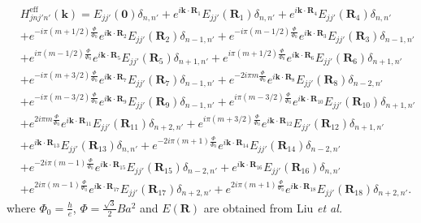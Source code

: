\documentclass{article}
\begin{document}
\begin{equation}
	\begin{aligned}
		 & H_{jnj'n'}^{\text{eff}}(\mathbf{k})
		= E_{jj'}(\mathbf{0}) \delta_{n,n'}
		+ e^{i\mathbf{k} \cdot \mathbf{R}_{1}}E_{jj'}(\mathbf{R}_{1}) \delta_{n,n'}
		+ e^{i\mathbf{k} \cdot \mathbf{R}_{4}}E_{jj'}(\mathbf{R}_{4}) \delta_{n,n'}                                                  \\
		 & + e^{-i\pi(m + 1/2)\frac{\Phi}{\Phi_{0}}}e^{i\mathbf{k} \cdot \mathbf{R}_{2}} E_{jj'}(\mathbf{R}_{2}) \delta_{n-1,n'}
		+ e^{-i\pi(m - 1/2)\frac{\Phi}{\Phi_{0}}} e^{i\mathbf{k} \cdot \mathbf{R}_{3}} E_{jj'}(\mathbf{R}_{3}) \delta_{n-1,n'}       \\
		 & + e^{i\pi(m - 1/2)\frac{\Phi}{\Phi_{0}}} e^{i\mathbf{k} \cdot \mathbf{R}_{5}} E_{jj'}(\mathbf{R}_{5}) \delta_{n+1,n'}
		+ e^{i\pi(m + 1/2)\frac{\Phi}{\Phi_{0}}} e^{i\mathbf{k} \cdot \mathbf{R}_{6}} E_{jj'}(\mathbf{R}_{6}) \delta_{n+1,n'}        \\
		 & + e^{- i\pi(m + 3/2)\frac{\Phi}{\Phi_{0}} } e^{i \mathbf{k} \cdot \mathbf{R}_{7}} E_{jj'}(\mathbf{R}_{7}) \delta_{n-1,n'}
		+ e^{- 2i\pi m\frac{\Phi}{\Phi_{0}} } e^{i \mathbf{k} \cdot \mathbf{R}_{8}} E_{jj'}(\mathbf{R}_{8}) \delta_{n-2,n'}          \\
		 & + e^{- i\pi(m - 3/2)\frac{\Phi}{\Phi_{0}} } e^{i \mathbf{k} \cdot \mathbf{R}_{9}} E_{jj'}(\mathbf{R}_{9}) \delta_{n-1,n'}
		+ e^{ i\pi (m-3/2)\frac{\Phi}{\Phi_{0}} } e^{i \mathbf{k} \cdot \mathbf{R}_{10}} E_{jj'}(\mathbf{R}_{10}) \delta_{n+1,n'}    \\
		 & + e^{2 i\pi m \frac{\Phi}{\Phi_{0}} } e^{i \mathbf{k} \cdot \mathbf{R}_{11}} E_{jj'}(\mathbf{R}_{11}) \delta_{n+2,n'}
		+ e^{ i\pi (m+3/2)\frac{\Phi}{\Phi_{0}} } e^{i \mathbf{k} \cdot \mathbf{R}_{12}} E_{jj'}(\mathbf{R}_{12}) \delta_{n+1,n'}    \\
		 & + e^{i \mathbf{k} \cdot \mathbf{R}_{13}} E_{jj'}(\mathbf{R}_{13}) \delta_{n,n'}
		+ e^{-2i\pi(m + 1) \frac{\Phi}{\Phi_{0}} } e^{i \mathbf{k} \cdot \mathbf{R}_{14}} E_{jj'}(\mathbf{R}_{14}) \delta_{n-2,n'}   \\
		 & + e^{-2i\pi(m - 1) \frac{\Phi}{\Phi_{0}}} e^{i \mathbf{k} \cdot \mathbf{R}_{15}} E_{jj'}(\mathbf{R}_{15}) \delta_{n-2,n'}
		+ e^{i \mathbf{k} \cdot \mathbf{R}_{16}} E_{jj'}(\mathbf{R}_{16}) \delta_{n,n'}                                              \\
		 & + e^{2i\pi(m - 1)\frac{\Phi}{\Phi_{0}}} e^{i \mathbf{k} \cdot \mathbf{R}_{17}} E_{jj'}(\mathbf{R}_{17}) \delta_{n+2,n'}
		+ e^{2i\pi(m + 1)\frac{\Phi}{\Phi_{0}}} e^{i \mathbf{k} \cdot \mathbf{R}_{18}} E_{jj'}(\mathbf{R}_{18}) \delta_{n+2,n'}.
	\end{aligned}
\end{equation}
where $\Phi_{0} = \frac{h}{e}$, $\Phi = \frac{\sqrt{3}}{2} Ba^{2}$ and $E(\mathbf{R})$ are obtained from Liu \textit{et al.}
\end{document}
